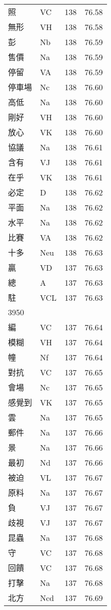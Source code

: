 \documentclass[twocolumn]{book}
\begin{document}
\begin{supertabular}{llrr}
照 & VC & 138 &  76.58\\
無形 & VH & 138 &  76.58\\
彭 & Nb & 138 &  76.59\\
售價 & Na & 138 &  76.59\\
停留 & VA & 138 &  76.59\\
停車場 & Nc & 138 &  76.60\\
高低 & Na & 138 &  76.60\\
剛好 & VH & 138 &  76.60\\
放心 & VK & 138 &  76.60\\
協議 & Na & 138 &  76.61\\
含有 & VJ & 138 &  76.61\\
在乎 & VK & 138 &  76.61\\
必定 & D & 138 &  76.62\\
平面 & Na & 138 &  76.62\\
水平 & Na & 138 &  76.62\\
比賽 & VA & 138 &  76.62\\
十多 & Neu & 138 &  76.63\\
贏 & VD & 137 &  76.63\\
總 & A & 137 &  76.63\\
駐 & VCL & 137 &  76.63\\
3950\\
編 & VC & 137 &  76.64\\
模糊 & VH & 137 &  76.64\\
幢 & Nf & 137 &  76.64\\
對抗 & VC & 137 &  76.65\\
會場 & Nc & 137 &  76.65\\
感覺到 & VK & 137 &  76.65\\
雲 & Na & 137 &  76.65\\
郵件 & Na & 137 &  76.66\\
景 & Na & 137 &  76.66\\
最初 & Nd & 137 &  76.66\\
被迫 & VL & 137 &  76.67\\
原料 & Na & 137 &  76.67\\
負 & VJ & 137 &  76.67\\
歧視 & VJ & 137 &  76.67\\
昆蟲 & Na & 137 &  76.68\\
守 & VC & 137 &  76.68\\
回饋 & VC & 137 &  76.68\\
打擊 & Na & 137 &  76.68\\
北方 & Ncd & 137 &  76.69\\

\end{supertabular}
\end{document}
